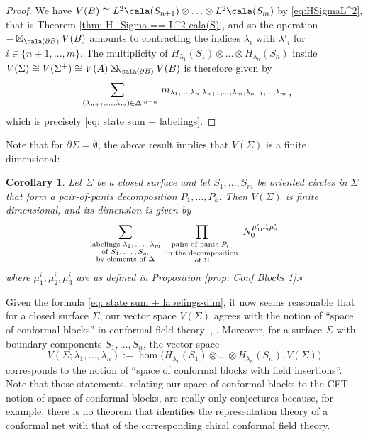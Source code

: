 \documentclass[a4paper,10pt,leqno]{amsart}
\theoremstyle{plain}
\newtheorem{corollary}[theorem]{Corollary}
\theoremstyle{definition}
\theoremstyle{remark}
\begin{document}
\begin{proof}
We have $V(B)\cong L^2\cala (S_{n+1})\otimes\ldots\otimes L^2\cala (S_m)$ by \eqref{eq:HSigmaL^2}, that is Theorem \ref{thm: H_Sigma == L^2 cala(S)}, and so
the operation $-\boxtimes_{\cala(\partial B)} V(B)$ amounts to contracting the indices $\lambda_i$ with $\lambda'_i$ for $i\in\{n+1,\ldots,m\}$.
The multiplicity of $H_{\lambda_1}(S_1)\otimes \ldots \otimes H_{\lambda_n}(S_n)$ inside $V(\Sigma)\cong V(\Sigma^+)\cong V(A)\boxtimes_{\cala(\partial B)} V(B)$ is therefore given by
\[
\raisebox{.1cm}{$\displaystyle\sum_{\,\,\,\,(\lambda_{n+1},\ldots,\lambda_m)\in\Delta^{m-n}}\,
m_{\lambda_1,\ldots,\lambda_n,\lambda_{n+1},\ldots,\lambda_m,\lambda_{n+1},\ldots,\lambda_m}$}\,,
\]
which is precisely \eqref{eq: state sum + labelings}.
\end{proof}

Note that for $\partial\Sigma=\emptyset$, the above result implies that $V(\Sigma)$ is a finite dimensional:

\begin{corollary}
Let $\Sigma$ be a closed surface and
let $S_1,\ldots,S_m$ be oriented circles in $\Sigma$ that form a pair-of-pants decomposition $P_1,\ldots,P_k$.
Then $V(\Sigma)$ is finite dimensional, and its dimension is given by
\begin{equation}\label{eq: state sum + labelings-dim}
\raisebox{.15cm}{$\displaystyle\sum_{\substack{\text{labelings $\lambda_{1},\ldots,\lambda_m$}\\\text{of $S_1,\ldots,S_m$}\\\text{by elements of $\Delta$}}}
\,\,\prod_{\substack{\text{pairs-of-pants $P_i{}_{\phantom{(}}$}\\\text{in the decomposition}\\\text{of $\Sigma$}}}
\,\,N_0^{\mu_1^i\mu_2^i\mu_3^i}
$}\end{equation}
where $\mu_1^i,\mu_2^i,\mu_3^i$ are as defined in Proposition \ref{prop: Conf Blocks 1}.\hfill $\square$
\end{corollary}

Given the formula \eqref{eq: state sum + labelings-dim}, it now seems reasonable 
that for a closed surface $\Sigma$, our vector space $V(\Sigma)$ agrees with
the notion of ``space of conformal blocks'' in conformal field 
theory~\cite{Friedan-Shenker(The-analytic-geometry-of-two-dimensional-conformal-field-theory)}, \cite{Moore-Seiberg(classical+quantum-conf-field-theory)}.
Moreover, for a surface $\Sigma$ with boundary components $S_1,\ldots,S_n$, the vector space
\begin{equation}\label{eq: conf bl with points}
V(\Sigma;\lambda_1,\ldots,\lambda_n):=\hom \big(H_{\lambda_1}(S_1)\otimes \ldots \otimes H_{\lambda_n}(S_n),V(\Sigma)\big)
\end{equation}
corresponds to the notion of ``space of conformal blocks with field insertions''.
Note that those statements, relating our space of conformal blocks to the CFT notion of space of conformal blocks, are really only conjectures because, for example,
there is no theorem that identifies the representation theory of a conformal net
with that of the corresponding chiral conformal field theory.
\end{document}
